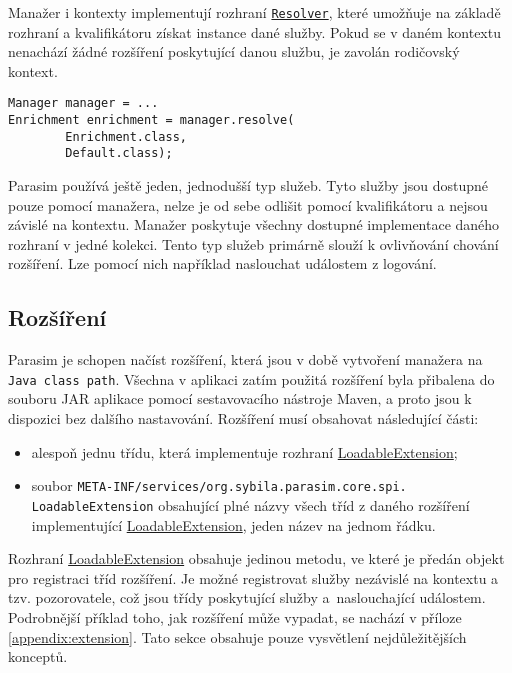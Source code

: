 Manažer i kontexty implementují rozhraní \href{https://github.com/sybila/parasim/blob/2.0.0.Final/core/src/main/java/org/sybila/parasim/core/api/Resolver.java}{\texttt{Resolver}},
které umožňuje na základě rozhraní a kvalifikátoru získat instance dané služby.
Pokud se v daném kontextu nenachází žádné rozšíření poskytující danou službu,
je zavolán rodičovský kontext. 

\begin{lstlisting}[label={code:resolve}, caption={Získání instance služby}, style=Java]
Manager manager = ...
Enrichment enrichment = manager.resolve(
		Enrichment.class,
		Default.class);
\end{lstlisting}

Parasim používá ještě jeden, jednodušší typ služeb. Tyto služby jsou dostupné pouze
pomocí manažera, nelze je od sebe odlišit pomocí kvalifikátoru a nejsou závislé na kontextu.
Manažer poskytuje všechny dostupné implementace daného rozhraní v jedné kolekci. Tento typ služeb
primárně  slouží k ovlivňování cho\-vání rozšíření. Lze pomocí nich například
naslouchat událostem z logování.

\subsection{Rozšíření}

Parasim je schopen načíst rozšíření, která jsou v době vytvoření manažera na \texttt{Java class path}.
Všechna v aplikaci zatím použitá rozšíření byla přibalena do souboru JAR aplikace pomocí sestavovacího
nástroje Maven, a proto jsou k dispozici bez dalšího nasta\-vo\-vá\-ní. Rozšíření musí obsahovat
následující části:

\begin{itemize}
	\item	alespoň jednu třídu, která implementuje rozhraní \href{https://github.com/sybila/parasim/blob/2.0.0.Final/core/src/main/java/org/sybila/parasim/core/spi/LoadableExtension.java}{LoadableExtension};
	\item	soubor \texttt{META-INF/services/org.sybila.parasim.core.spi.\\LoadableExtension} obsahující plné názvy všech tříd z daného roz\-ší\-ření implementující \href{https://github.com/sybila/parasim/blob/2.0.0.Final/core/src/main/java/org/sybila/parasim/core/spi/LoadableExtension.java}{LoadableExtension}, jeden název na jednom řád\-ku. 
\end{itemize}

Rozhraní \href{https://github.com/sybila/parasim/blob/2.0.0.Final/core/src/main/java/org/sybila/parasim/core/spi/LoadableExtension.java}{LoadableExtension}
obsahuje jedinou metodu, ve které je pře\-dán objekt pro registraci tříd rozšíření. Je možné
registrovat služby ne\-zá\-vi\-slé na kontextu a tzv. pozorovatele, což jsou třídy poskytující
služby a~na\-slou\-cha\-jí\-cí událostem. Podrobnější příklad toho, jak rozšíření může vypadat,
se nachází v příloze \ref{appendix:extension}. Tato sekce obsahuje pouze vysvětlení
nej\-dů\-le\-ži\-těj\-ších konceptů.

